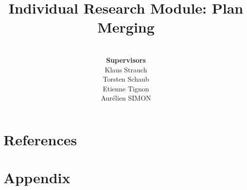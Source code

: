 \documentclass{article}
\theoremstyle{definition}
\begin{document}
\title{\huge{Individual Research Module: Plan Merging}}

\author{
\\[1cm] \textbf{Supervisors}
\\[0.2cm] Klaus Strauch 
\\[0.2cm] Torsten Schaub
\\[0.2cm] Etienne Tignon
\\[3cm] Aurélien SIMON }

\maketitle
\thispagestyle{empty}



\newpage
\setcounter{page}{1}
\tableofcontents
\newpage
\listoffigures

\newpage









% 
\newpage

\newpage


\section{References}
\printbibliography[heading=none]

\section*{Appendix}

\end{document}
